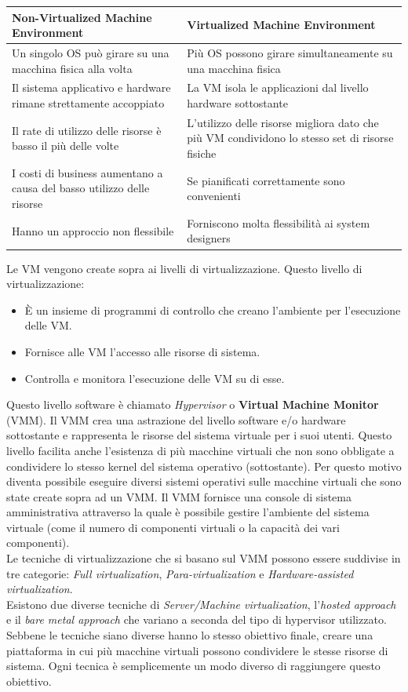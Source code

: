 \documentclass{article}
\begin{document}
\begin{table}[H]
    \begin{tabularx}{\linewidth}{X | X}
    \hline
    \textbf{Non-Virtualized Machine Environment} & \textbf{Virtualized Machine Environment}\\ [0.5ex]
    \hline\hline
    Un singolo OS può girare su una macchina fisica alla volta &
    Più OS possono girare simultaneamente su una macchina fisica \\
    \hline
    Il sistema applicativo e hardware rimane strettamente accoppiato &
    La VM isola le applicazioni dal livello hardware sottostante \\
    \hline
    Il rate di utilizzo delle risorse è basso il più delle volte & 
    L'utilizzo delle risorse migliora dato che più VM condividono lo stesso set di risorse fisiche \\
    \hline
    I costi di business aumentano a causa del basso utilizzo delle risorse & Se pianificati correttamente sono convenienti \\
    \hline
    Hanno un approccio non flessibile & 
    Forniscono molta flessibilità ai system designers\\ [1ex] 
    \hline
    \end{tabularx}
\end{table}
Le VM vengono create sopra ai livelli di virtualizzazione. Questo livello di virtualizzazione:
\begin{itemize}
    \item È un insieme di programmi di controllo che creano l'ambiente per l'esecuzione delle VM.
    \item Fornisce alle VM l'accesso alle risorse di sistema.
    \item Controlla e monitora l'esecuzione delle VM su di esse. 
\end{itemize}
Questo livello software è chiamato \textit{Hypervisor} o \textbf{Virtual Machine Monitor} (VMM). Il VMM crea una astrazione del livello software e/o hardware sottostante e rappresenta le risorse del sistema virtuale per i suoi utenti. Questo livello facilita anche l’esistenza di più macchine virtuali che non sono obbligate a condividere lo stesso kernel del sistema operativo (sottostante). Per questo motivo diventa possibile eseguire diversi sistemi operativi sulle macchine virtuali che sono state create sopra ad un VMM. Il VMM fornisce una console di sistema amministrativa attraverso la quale è possibile gestire l’ambiente del sistema virtuale (come il numero di componenti virtuali o la capacità dei vari componenti). \\
Le tecniche di virtualizzazione che si basano sul VMM possono essere suddivise in tre categorie: \textit{Full virtualization}, \textit{Para-virtualization} e \textit{Hardware-assisted virtualization}. \\
Esistono due diverse tecniche di \textit{Server/Machine virtualization}, l’\textit{hosted approach} e il \textit{bare metal approach} che variano a seconda del tipo di hypervisor utilizzato. Sebbene le tecniche siano diverse hanno lo stesso obiettivo finale, creare una piattaforma in cui più macchine virtuali possono condividere le stesse risorse di sistema. Ogni tecnica è semplicemente un modo diverso di raggiungere questo obiettivo.
\end{document}
